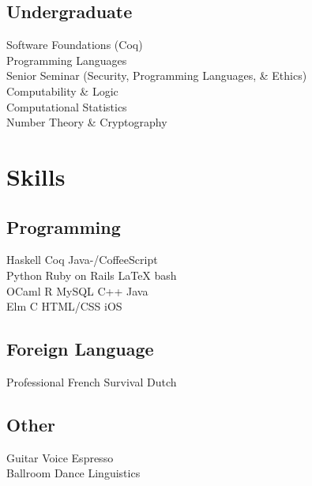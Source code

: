 \documentclass[]{deedy-resume-openfont}
\begin{document}
\begin{minipage}[t]{0.33\textwidth}
\subsection{Undergraduate}
Software Foundations (Coq) \\
Programming Languages \\
Senior Seminar (Security, Programming Languages, \& Ethics) \\
Computability \& Logic \\
Computational Statistics \\
Number Theory \& Cryptography
\sectionsep


\section{Skills}
\subsection{Programming}
Haskell \textbullet{} Coq \textbullet{} Java-/CoffeeScript   \\
Python \textbullet{} Ruby on Rails \textbullet{} \LaTeX \textbullet{} bash \\ 
OCaml \textbullet{} R \textbullet{} MySQL \textbullet{} C++ \textbullet{} Java \\
Elm \textbullet{} C  \textbullet{} HTML/CSS  \textbullet{} iOS
\sectionsep

\subsection{Foreign Language}
Professional French \textbullet{} Survival Dutch
\sectionsep

\subsection{Other}
Guitar \textbullet{} Voice \textbullet{} Espresso \\
Ballroom Dance \textbullet{} Linguistics


%
%

\end{minipage} 
\hfill
\end{document}
